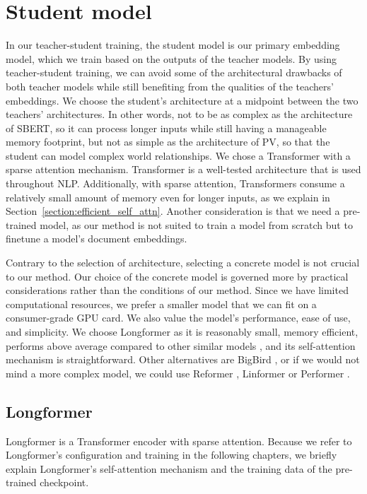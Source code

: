 \section{Student model}\label{section:student_model}

In our teacher-student training, the student model is our primary embedding
model, which we train based on the outputs of the teacher models. By using
teacher-student training, we can avoid some of the architectural drawbacks of
both teacher models while still benefiting from the qualities of the teachers'
embeddings. We choose the student's architecture at a midpoint between
the two teachers' architectures. In other words, not to be as complex as the
architecture of SBERT, so it can process longer inputs while still having a
manageable memory footprint, but not as simple as the architecture of PV, so
that the student can model complex world relationships. We chose a Transformer
with a sparse attention mechanism. Transformer is a well-tested architecture
that is used throughout NLP. Additionally, with sparse attention, Transformers
consume a relatively small amount of memory even for longer inputs, as we
explain in Section~\ref{section:efficient_self_attn}. Another consideration is
that we need a pre-trained model, as our method is not suited to train a model
from scratch but to finetune a model's document embeddings.

Contrary to the selection of architecture, selecting a concrete model is not
crucial to our method. Our choice of the concrete model is governed more by
practical considerations rather than the conditions of our method. Since we
have limited computational resources, we prefer a smaller model that we can fit
on a consumer-grade GPU card. We also value the model's performance, ease of
use, and simplicity. We choose Longformer \citep{beltagy2020longformer} as it
is reasonably small, memory efficient, performs above average compared to other
similar models \citep{tay2020long}, and its self-attention mechanism is
straightforward. Other alternatives are BigBird \citep{zaheer2020big}, or if we
would not mind a more complex model, we could use Reformer
\citep{kitaev2020reformer}, Linformer \citep{wang2020linformer} or Performer
\citep{choromanski2020rethinking}.

\subsection{Longformer}

Longformer \citep{beltagy2020longformer} is a Transformer encoder with sparse
attention. Because we refer to Longformer's configuration and training in the
following chapters, we briefly explain Longformer's self-attention mechanism
and the training data of the pre-trained checkpoint.



